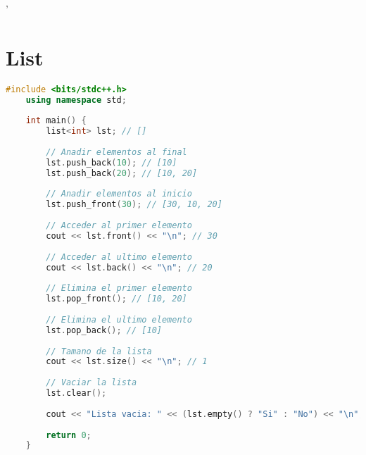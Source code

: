
'\section*{List}

\begin{lstlisting}[language=C++]
	#include <bits/stdc++.h>
	using namespace std;
	
	int main() {
		list<int> lst; // []
		
		// Anadir elementos al final
		lst.push_back(10); // [10]
		lst.push_back(20); // [10, 20]
		
		// Anadir elementos al inicio
		lst.push_front(30); // [30, 10, 20]
		
		// Acceder al primer elemento
		cout << lst.front() << "\n"; // 30
		
		// Acceder al ultimo elemento
		cout << lst.back() << "\n"; // 20
		
		// Elimina el primer elemento
		lst.pop_front(); // [10, 20]
		
		// Elimina el ultimo elemento
		lst.pop_back(); // [10]
		
		// Tamano de la lista
		cout << lst.size() << "\n"; // 1
		
		// Vaciar la lista
		lst.clear();
		
		cout << "Lista vacia: " << (lst.empty() ? "Si" : "No") << "\n";
		
		return 0;
	}
\end{lstlisting}
